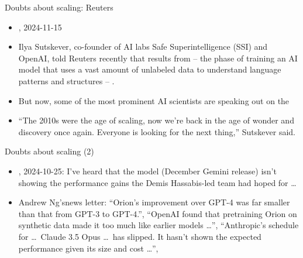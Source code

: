 

\begin{vbframe}{Doubts about scaling: Reuters}

\vfill

\begin{itemize}
\item {}, 2024-11-15
\item Ilya Sutskever, co-founder of AI labs Safe Superintelligence
	(SSI) and OpenAI, told Reuters recently that results
	from  -- the phase of training
	an AI model that uses a vast amount of unlabeled
	data to understand language patterns and structures
	-- .
	\item
But now, some of the most prominent AI scientists are
speaking out on the 
\item “The 2010s were the age of scaling, now we're back in
	the age of wonder and discovery once again. Everyone
	is looking for the next thing,” Sutskever
	said. 
\end{itemize}


\vfill

\end{vbframe}


\begin{vbframe}{Doubts about scaling (2)}

\vfill

\begin{itemize}
\item {}, 2024-10-25:
 I've heard that the model (December Gemini release) isn't showing the
	performance
        gains the Demis Hassabis-led team had hoped for \ldots
\item Andrew Ng'snews letter:
``Orion’s improvement over GPT-4 was
far smaller than that from GPT-3 to GPT-4.'',
``OpenAI found that pretraining Orion on
synthetic data made it too much like earlier models \ldots'',
``Anthropic’s schedule for \ldots\ Claude 3.5 Opus \ldots\
has slipped. It
hasn’t shown the expected performance given its size and
cost \ldots'',
\end{itemize}


\vfill

\end{vbframe}

